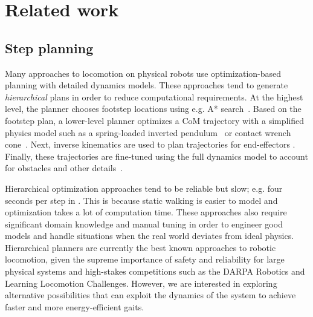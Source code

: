 \documentclass[conference]{IEEEtran}
\newcommand{\nhatch}[1]{{\leavevmode\color{magenta} Nathan: #1}}
\begin{document}
\section{Related work}

\subsection{Step planning}

Many approaches to locomotion on physical robots use optimization-based planning with detailed dynamics models.
These approaches tend to generate \emph{hierarchical} plans in order to reduce computational requirements.
At the highest level, the planner chooses footstep locations using e.g. A* search~\citep{huang2013step}.
Based on the footstep plan, a lower-level planner optimizes a CoM trajectory with a simplified physics model such as a spring-loaded inverted pendulum~\citep{mordatch2010robust} or contact wrench cone~\citep{dai2016planning}.
Next, inverse kinematics are used to plan trajectories for end-effectors \citep{zucker2010optimization}.
Finally, these trajectories are fine-tuned using the full dynamics model to account for obstacles and other details~\citep{ratliff2009chomp}.

Hierarchical optimization approaches tend to be reliable but slow; e.g. four seconds per step in \citet{feng2015optimization}.
This is because static walking is easier to model and optimization takes a lot of computation time.
These approaches also require significant domain knowledge and manual tuning in order to engineer good models and handle situations when the real world deviates from ideal physics.
Hierarchical planners are currently the best known approaches to robotic locomotion, given the supreme importance of safety and reliability for large physical systems and high-stakes competitions such as the DARPA Robotics and Learning Locomotion Challenges.
However, we are interested in exploring alternative possibilities that can exploit the dynamics of the system to achieve faster and more energy-efficient gaits.

\end{document}
